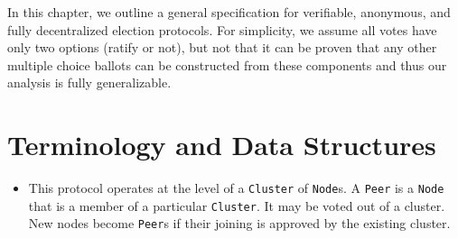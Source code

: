 In this chapter, we outline a general specification for verifiable, anonymous,
and fully decentralized election protocols. For simplicity, we assume all votes
have only two options (ratify or not), but not that it can be proven that any
other multiple choice ballots can be constructed from these components and thus
our analysis is fully generalizable.
\section{Terminology and Data Structures}
\begin{itemize}
  \item This protocol operates at the level of a \texttt{Cluster} of
    \texttt{Node}s.  A \texttt{Peer} is a \texttt{Node} that is a member of a
    particular \texttt{Cluster}. It may be voted out of a cluster. New nodes
    become \texttt{Peer}s if their joining is approved by the existing cluster.


\end{itemize}
